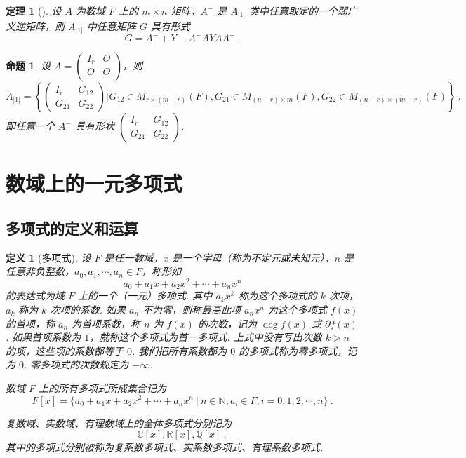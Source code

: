 \documentclass[zihao=-4,UTF8,linespread=1.8,nothm]{aytony_base}
\newtheorem{theorem}{\indent 定理}[subsection]
\newtheorem{proposition}{\indent 命题}[subsection]
\newtheorem{definition}{\indent 定义}[subsection]
\begin{document}
\begin{theorem}[]
    设 $A$ 为数域 $F$ 上的 $m \times n$ 矩阵，$A^-$ 是 $A_{|1|}$ 类中任意取定的一个弱广义逆矩阵，则 $A_{|1|}$ 中任意矩阵 $G$ 具有形式 $$
        G = A^{-} + Y - A^-AYAA^-\ .
    $$
\end{theorem}

\begin{proposition}
    设 $A = \left(
        \begin{matrix}
                I_r & O \\
                O   & O \\
            \end{matrix}
        \right)$，则 $$
        A_{|1|} = \left\{\left(
        \begin{matrix}
                I_r    & G_{12} \\
                G_{21} & G_{22}
            \end{matrix}
        \right) \left.\right|_{}G_{12} \in M_{r \times (m-r)}(F), G_{21} \in M_{(n-r)\times m}(F), G_{22} \in M_{(n-r)\times(m-r)}(F)\right\}\ ,
    $$ 即任意一个 $A^-$ 具有形状 $\left(\begin{matrix}
                I_r    & G_{12} \\
                G_{21} & G_{22}
            \end{matrix}\right)$.
\end{proposition}

\section{数域上的一元多项式}

\subsection{多项式的定义和运算}

\begin{definition}[多项式]
    设 $F$ 是任一数域，$x$ 是一个字母（称为不定元或未知元），$n$ 是任意非负整数，$a_0, a_1, \cdots, a_n \in F$，称形如 $$
        a_0 + a_1x + a_2x^2 + \cdots + a_nx^n
    $$ 的表达式为域 $F$ 上的一个（一元）多项式. 其中 $a_kx^k$ 称为这个多项式的 $k$ 次项，$a_k$ 称为 $k$ 次项的系数. 如果 $a_n$ 不为零，则称最高此项 $a_nx^n$ 为这个多项式 $f(x)$ 的首项，称 $a_n$ 为首项系数，称 $n$ 为 $f(x)$ 的次数，记为 $\deg f(x)$ 或 $\partial f(x)$. 如果首项系数为 $1$，就称这个多项式为首一多项式. 上式中没有写出次数 $k > n$ 的项，这些项的系数都等于 $0$. 我们把所有系数都为 $0$ 的多项式称为零多项式，记为 $0$. 零多项式的次数规定为 $-\infty$.

    数域 $F$ 上的所有多项式所成集合记为 $$
        F[x] = \{a_0 + a_1x + a_2x^2 + \cdots + a_nx^n\  |\  n \in \mathbb{N}, a_i \in F, i = 0, 1, 2, \cdots, n\}\ .
    $$

    复数域、实数域、有理数域上的全体多项式分别记为 $$
        \mathbb{C}[x], \mathbb{R}[x], \mathbb{Q}[x]\ ,
    $$ 其中的多项式分别被称为复系数多项式、实系数多项式、有理系数多项式.
\end{definition}
\end{document}
